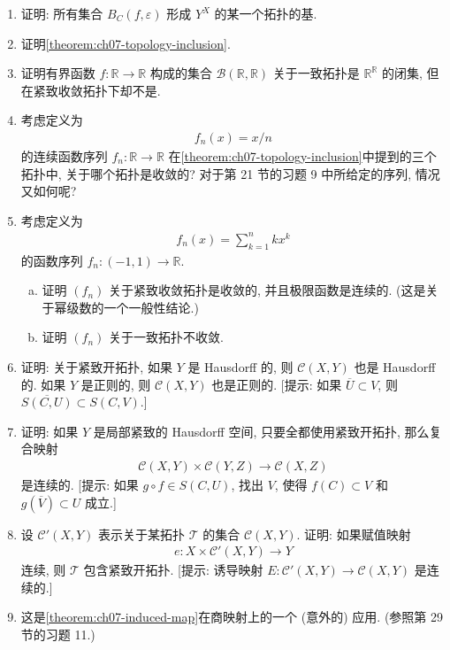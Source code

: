 \documentclass[../../main.tex]{subfiles}
\begin{document}
\begin{enumerate}
\item 证明: 所有集合 $B_C(f,\varepsilon)$ 形成 $Y^X$ 的某一个拓扑的基.
\item 证明\cref{theorem:ch07-topology-inclusion}.
\item 证明有界函数 $f\colon\mathbb{R}\to\mathbb{R}$ 构成的集合 $\mathcal{B}(\mathbb{R},\mathbb{R})$ 关于一致拓扑是 $\mathbb{R}^{\mathbb{R}}$ 的闭集, 但在紧致收敛拓扑下却不是.
\item 考虑定义为
\begin{align*}
f_n(x)=x/n
\end{align*}
的连续函数序列 $f_n\colon\mathbb{R}\to\mathbb{R}$ 在\cref{theorem:ch07-topology-inclusion}中提到的三个拓扑中, 关于哪个拓扑是收敛的? 对于第 21 节的习题 9 中所给定的序列, 情况又如何呢?
\item 考虑定义为
\begin{align*}
f_n(x)=\sum_{k=1}^n kx^k
\end{align*}
的函数序列 $f_n\colon(-1,1)\to\mathbb{R}$.
\begin{enumerate}[(a)]
\item 证明 $(f_n)$ 关于紧致收敛拓扑是收敛的, 并且极限函数是连续的. (这是关于幂级数的一个一般性结论.)
\item 证明 $(f_n)$ 关于一致拓扑不收敛.
\end{enumerate}
\item 证明: 关于紧致开拓扑, 如果 $Y$ 是 Hausdorff 的, 则 $\mathcal{C}(X,Y)$ 也是 Hausdorff 的. 如果 $Y$ 是正则的, 则 $\mathcal{C}(X,Y)$ 也是正则的. [提示: 如果 $\overline{U}\subset V$, 则 $\overline{S(C,U)}\subset S(C,V)$.]
\item 证明: 如果 $Y$ 是局部紧致的 Hausdorff 空间, 只要全都使用紧致开拓扑, 那么复合映射
\begin{align*}
\mathcal{C}(X,Y)\times\mathcal{C}(Y,Z)\longrightarrow\mathcal{C}(X,Z)
\end{align*}
是连续的. [提示: 如果 $g\circ f\in S(C,U)$, 找出 $V$, 使得 $f(C)\subset V$ 和 $g(\overline{V})\subset U$ 成立.]
\item 设 $\mathcal{C}'(X,Y)$ 表示关于某拓扑 $\mathcal{T}$ 的集合 $\mathcal{C}(X,Y)$. 证明: 如果赋值映射
\begin{align*}
e\colon X\times\mathcal{C}'(X,Y)\longrightarrow Y
\end{align*}
连续, 则 $\mathcal{T}$ 包含紧致开拓扑. [提示: 诱导映射 $E\colon\mathcal{C}'(X,Y)\to\mathcal{C}(X,Y)$ 是连续的.]
\item 这是\cref{theorem:ch07-induced-map}在商映射上的一个 (意外的) 应用. (参照第 29 节的习题 11.)

\end{enumerate}
\end{document}
